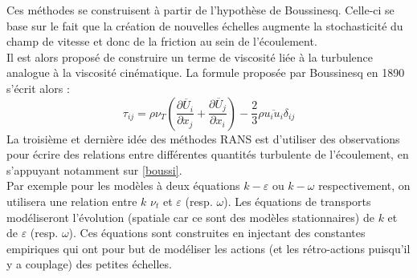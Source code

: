 \documentclass[a4paper,12pt]{article}
\newcommand{\bepar}[1]{
	\left( #1 \right)  
}
\newcommand{\keps}{$k-\varepsilon$}
\numberwithin{equation}{section} %
\begin{document}
\noindent Ces méthodes se construisent à partir de l'hypothèse de Boussinesq. Celle-ci se base sur le fait que la création de nouvelles échelles augmente la stochasticité du champ de vitesse et donc de la friction au sein de l'écoulement.\\
  Il est alors proposé de construire un terme de viscosité liée à la turbulence analogue à la viscosité cinématique. La formule proposée par Boussinesq en 1890 s'écrit alors : 
\begin{equation}
\tau_{ij} = \rho \nu_T\bepar{\frac{\partial \overline{U}_i}{\partial x_j} + \frac{\partial \overline{U}_j}{\partial x_i}} - \frac{2}{3} \rho \overline{u_iu_i} \delta_{ij} \label{boussi}
\end{equation} 
La troisième et dernière idée des méthodes RANS est d'utiliser des observations pour écrire des relations entre différentes quantités turbulente de l'écoulement, en s'appuyant notamment sur \eqref{boussi}. \\
Par exemple pour les modèles à deux équations \keps $ $ ou $k-\omega$ respectivement, on utilisera une relation entre $k$ $\nu_t$ et $\varepsilon$ (resp. $\omega$). Les équations de transports modéliseront l'évolution (spatiale car ce sont des modèles stationnaires) de $k$ et de $\varepsilon$ (resp. $\omega$). Ces équations sont construites en injectant des constantes empiriques qui ont pour but de modéliser les actions (et les rétro-actions puisqu'il y a couplage) des petites échelles.\\

\end{document}

